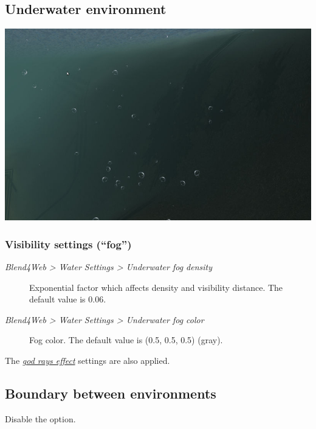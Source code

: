 \documentclass[a4paper,12pt,oneside]{sphinxmanual}
\begin{document}
\subsection{Underwater environment}
\label{outdoor_rendering:id17}
{\hfill\includegraphics[width=1.000\linewidth]{underwater.jpg}\hfill}


\subsubsection{Visibility settings (``fog'')}
\label{outdoor_rendering:id18}\begin{description}
\item[{\emph{Blend4Web \textgreater{} Water Settings \textgreater{} Underwater fog density}}] \leavevmode
Exponential factor which affects density and visibility distance. The default value is 0.06.

\item[{\emph{Blend4Web \textgreater{} Water Settings \textgreater{} Underwater fog color}}] \leavevmode
Fog color. The default value is (0.5, 0.5, 0.5) (gray).

\end{description}

The {\hyperref[postprocessing_effects:god-rays]{\emph{god rays effect}}} settings are also applied.


\subsection{Boundary between environments}
\label{outdoor_rendering:id19}
Disable the  option.
\end{document}
